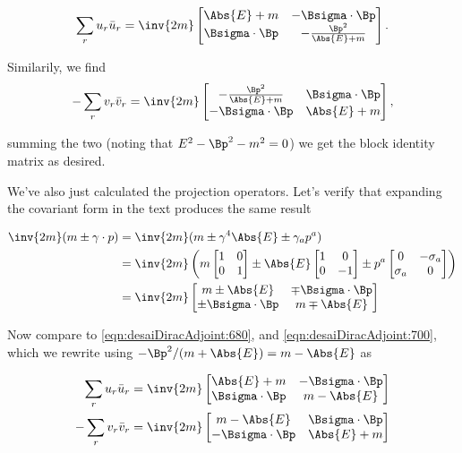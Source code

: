 \begin{equation}\label{eqn:desaiDiracAdjoint:680}
\sum_r u_r \bar{u}_r 
=
\inv{2m}
\begin{bmatrix}
\Abs{E} + m & -\Bsigma \cdot \Bp \\
\Bsigma \cdot \Bp &
-\frac{\Bp^2}{\Abs{E} + m} 
\end{bmatrix}.
\end{equation}

Similarily, we find
\begin{equation}\label{eqn:desaiDiracAdjoint:700}
-\sum_r v_r \bar{v}_r 
=
\inv{2m}
\begin{bmatrix}
-\frac{\Bp^2}{\Abs{E} + m}  & \Bsigma \cdot \Bp \\
-\Bsigma \cdot \Bp  & \Abs{E} + m 
\end{bmatrix},
\end{equation}

summing the two (noting that $E^2 - \Bp^2 - m^2 = 0$) we get the block identity matrix as desired.

We've also just calculated the projection operators.  Let's verify that expanding the covariant form in the text produces the same result

\begin{align*}
\inv{2m}(m \pm \gamma \cdot p) 
&=
\inv{2m}(m \pm \gamma^4 \Abs{E} \pm \gamma_a p^a ) \\
&=
\inv{2m}
\left(
m
\begin{bmatrix}
1 & 0 \\
0 & 1
\end{bmatrix}
\pm \Abs{E}
\begin{bmatrix}
1 & 0 \\
0 & -1
\end{bmatrix}
\pm p^a
\begin{bmatrix}
0 & -\sigma_a \\
\sigma_a & 0 
\end{bmatrix}
\right) \\
&=
\inv{2m}
\begin{bmatrix}
m \pm \Abs{E} & \mp \Bsigma \cdot \Bp \\
\pm \Bsigma \cdot \Bp & m \mp \Abs{E} 
\end{bmatrix}
\end{align*}

Now compare to \ref{eqn:desaiDiracAdjoint:680}, and \ref{eqn:desaiDiracAdjoint:700}, which we rewrite using $-\Bp^2/(m + \Abs{E}) = m - \Abs{E}$ as 

\begin{align}\label{eqn:desaiDiracAdjoint:680b}
\sum_r u_r \bar{u}_r 
&=
\inv{2m}
\begin{bmatrix}
\Abs{E} + m & -\Bsigma \cdot \Bp \\
\Bsigma \cdot \Bp &
m - \Abs{E}
\end{bmatrix} \\
-\sum_r v_r \bar{v}_r 
&=
\inv{2m}
\begin{bmatrix}
m - \Abs{E} & \Bsigma \cdot \Bp \\
-\Bsigma \cdot \Bp  & \Abs{E} + m 
\end{bmatrix}
\end{align}

\EndArticle
